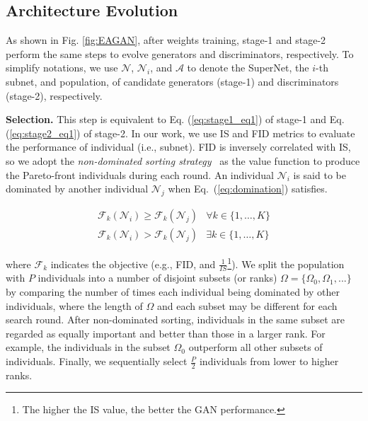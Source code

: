 \documentclass[runningheads]{llncs}
\begin{document}
\subsection{Architecture Evolution}\label{sec:evolution}












As shown in Fig. \ref{fig:EAGAN}, after weights training, stage-1 and stage-2 perform the same steps to evolve generators and discriminators, respectively. To simplify notations, we use $\mathcal{N}$, $\mathcal{N}_i$, and $\mathcal{A}$ to denote the SuperNet, the $i$-th subnet, and population, of candidate generators (stage-1) and discriminators (stage-2), respectively.






\textbf{Selection.} This step is equivalent to Eq. (\ref{eq:stage1_eq1}) of stage-1 and Eq. (\ref{eq:stage2_eq1}) of stage-2. In our work, we use IS \cite{IS} and FID \cite{FID} metrics to evaluate the performance of individual (i.e., subnet). FID is inversely correlated with IS, so we adopt the \textit{non-dominated sorting strategy}~\cite{nsga2} as the value function to produce the Pareto-front individuals during each round. An individual $\mathcal{N}_i$ is said to be dominated by another individual $\mathcal{N}_j$  when Eq.~(\ref{eq:domination}) satisfies.



\begin{equation}
\begin{array}{ll}
\mathcal{F}_{k}\left(\mathcal{N}_i\right) \geq \mathcal{F}_{k}\left(\mathcal{N}_j\right) & \forall k \in\{1, \ldots, K\} \\
\mathcal{F}_{k}\left(\mathcal{N}_i\right)>\mathcal{F}_{k}\left(\mathcal{N}_j\right) & \exists k \in\{1, \ldots, K\}
\end{array}
\label{eq:domination}
\end{equation}


\noindent where $\mathcal{F}_k$ indicates the objective (e.g., FID, and $\frac{1}{IS}$\footnote{The higher the IS value, the better the GAN performance.}). We split the population with $P$ individuals into a number of disjoint subsets (or ranks) $\Omega=\{\Omega_0, \Omega_1,...\}$ by comparing the number of times each individual being dominated by other individuals, where the length of $\Omega$ and each subset may be different for each search round. After non-dominated sorting, individuals in the same subset are regarded as equally important and better than those in a larger rank. For example, the individuals in the subset $\Omega_0$ outperform all other subsets of individuals. Finally, we sequentially select $\frac{P}{2}$ individuals from lower to higher ranks.
\end{document}
